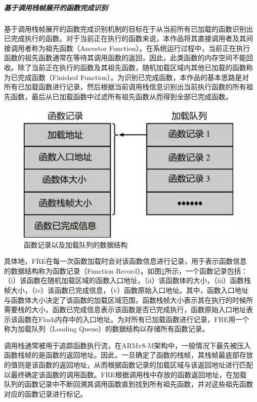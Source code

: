 \documentclass[UTF8,12pt,a4paper]{ctexart}
\numberwithin{figure}{section}
\begin{document}
\subparagraph{基于调用栈帧展开的函数完成识别}
\par 基于调用栈帧展开的函数完成识别机制的目标在于从当前所有已加载的函数识别出已完成执行的函数。对于当前正在执行的函数来说，本作品将其直接调用者及其间接调用者称为祖先函数（Ancestor Function）。在系统运行过程中，当前正在执行函数的祖先函数通常在等待其调用函数的返回，因此，此类函数的内存空间不能回收。除了当前正在执行的函数及其祖先函数，随机加载区域内其他已加载的函数称为已完成函数（Finished Function）。为识别已完成函数，本作品的基本思路是对所有已加载函数进行记录，然后根据当前调用栈信息识别出当前执行函数的所有祖先函数，最后从已加载函数中过滤所有祖先函数从而得到全部已完成函数。
\begin{figure}[H]
    \centering
    \includegraphics[scale=0.5]{graph/dataStructure.png}
    \caption{函数记录以及加载队列的数据结构}
    \label{fig:dataStructure}
\end{figure}
\par 具体地，FRE在每一次函数加载时会对该函数信息进行记录，用于表示函数信息的数据结构称为函数记录（Function Record）。如图\ref{fig:dataStructure}所示，一个函数记录包括：（i）该函数在随机加载区域的函数入口地址，（ii）该函数体的大小，（iii）函数栈帧大小，（iv）该函数已完成信息，（v）函数原始入口地址。其中，函数入口地址与函数体大小决定了该函数的加载区域范围，函数栈帧大小表示其在执行的时候所需要栈的大小，函数已完成信息表示该函数是否已完成执行，函数原始入口地址表示该函数在Flash内存中的入口地址。为对所有已加载函数进行记录，FRE用一个称为加载队列（Loading Queue）的数据结构以存储所有函数记录。
\par 调用栈通常被用于追踪函数执行流，在ARMv8-M架构中，一般情况下最先被压入函数栈帧的是函数的返回地址。因此，一旦确定了函数的栈帧，其栈帧最底部存放的值则是该函数的返回地址，从而根据函数记录的加载区域与该返回地址进行匹配以最终确定该函数的调用函数。FRE根据调用栈中存放的函数返回地址，在加载队列的函数记录中不断回溯其调用函数直到找到所有祖先函数，并对这些祖先函数对应的函数记录进行标记。
\end{document}
